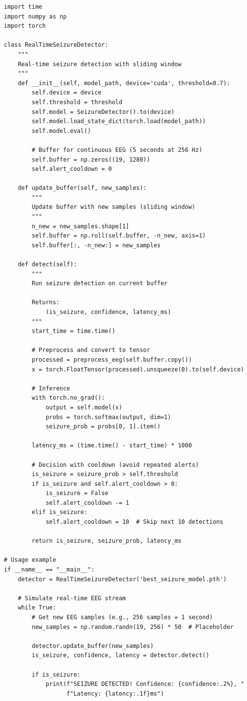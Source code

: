 \documentclass[12pt,a4paper]{article}
\begin{document}
\begin{lstlisting}[style=pythonstyle, caption={Real-Time Seizure Detection Inference}, label={lst:inference}]
import time
import numpy as np
import torch

class RealTimeSeizureDetector:
    """
    Real-time seizure detection with sliding window
    """
    def __init__(self, model_path, device='cuda', threshold=0.7):
        self.device = device
        self.threshold = threshold
        self.model = SeizureDetector().to(device)
        self.model.load_state_dict(torch.load(model_path))
        self.model.eval()

        # Buffer for continuous EEG (5 seconds at 256 Hz)
        self.buffer = np.zeros((19, 1280))
        self.alert_cooldown = 0

    def update_buffer(self, new_samples):
        """
        Update buffer with new samples (sliding window)
        """
        n_new = new_samples.shape[1]
        self.buffer = np.roll(self.buffer, -n_new, axis=1)
        self.buffer[:, -n_new:] = new_samples

    def detect(self):
        """
        Run seizure detection on current buffer

        Returns:
            (is_seizure, confidence, latency_ms)
        """
        start_time = time.time()

        # Preprocess and convert to tensor
        processed = preprocess_eeg(self.buffer.copy())
        x = torch.FloatTensor(processed).unsqueeze(0).to(self.device)

        # Inference
        with torch.no_grad():
            output = self.model(x)
            probs = torch.softmax(output, dim=1)
            seizure_prob = probs[0, 1].item()

        latency_ms = (time.time() - start_time) * 1000

        # Decision with cooldown (avoid repeated alerts)
        is_seizure = seizure_prob > self.threshold
        if is_seizure and self.alert_cooldown > 0:
            is_seizure = False
            self.alert_cooldown -= 1
        elif is_seizure:
            self.alert_cooldown = 10  # Skip next 10 detections

        return is_seizure, seizure_prob, latency_ms

# Usage example
if __name__ == "__main__":
    detector = RealTimeSeizureDetector('best_seizure_model.pth')

    # Simulate real-time EEG stream
    while True:
        # Get new EEG samples (e.g., 256 samples = 1 second)
        new_samples = np.random.randn(19, 256) * 50  # Placeholder

        detector.update_buffer(new_samples)
        is_seizure, confidence, latency = detector.detect()

        if is_seizure:
            print(f"SEIZURE DETECTED! Confidence: {confidence:.2%}, "
                  f"Latency: {latency:.1f}ms")
\end{lstlisting}
\end{document}
